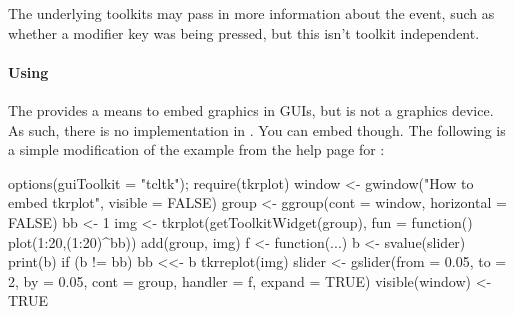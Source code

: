 The underlying toolkits may pass in more information about the event,
such as whether a modifier key was being pressed, but this isn't
toolkit independent.

\paragraph{Using } The  provides a means to embed
graphics in  GUIs, but is not a graphics device. As such,
there is no  implementation in
. You can embed  though. The
following is a simple modification of the example from the help page for :

\begin{Schunk}
\begin{Sinput}
 options(guiToolkit = "tcltk"); require(tkrplot)
 window <- gwindow("How to embed tkrplot", visible = FALSE)
 group <- ggroup(cont = window, horizontal = FALSE)
 bb <- 1
 img <- tkrplot(getToolkitWidget(group), 
                fun = function() plot(1:20,(1:20)^bb))
 add(group, img)
 f <- function(...) {
   b <- svalue(slider)
   print(b)
   if (b != bb) {
     bb <<- b
     tkrreplot(img)
   }
 }
 slider <- gslider(from = 0.05, to = 2, by = 0.05, cont = group, 
                   handler = f, expand = TRUE)
 visible(window) <- TRUE
 
\end{Sinput}
\end{Schunk}


